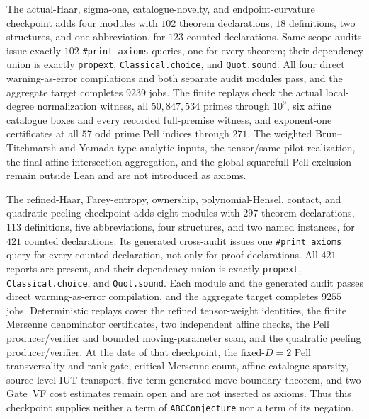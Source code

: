 \documentclass[11pt]{amsart}
\theoremstyle{definition}
\theoremstyle{remark}
\begin{document}
The actual-Haar, sigma-one, catalogue-novelty, and endpoint-curvature
checkpoint adds four modules with $102$ theorem declarations, $18$
definitions, two structures, and one abbreviation, for $123$ counted
declarations.  Same-scope audits issue exactly $102$
\texttt{\#print axioms} queries, one for every theorem; their dependency
union is exactly \texttt{propext}, \texttt{Classical.choice}, and
\texttt{Quot.sound}.  All four direct warning-as-error compilations and both
separate audit modules pass, and the aggregate target completes $9239$ jobs.
The finite replays check the actual local-degree normalization witness, all
$50{,}847{,}534$ primes through $10^9$, six affine catalogue boxes and every
recorded full-premise witness, and exponent-one certificates at all $57$ odd
prime Pell indices through $271$.  The weighted Brun--Titchmarsh and
Yamada-type analytic inputs, the tensor/same-pilot realization, the final
affine intersection aggregation, and the global squarefull Pell exclusion
remain outside Lean and are not introduced as axioms.

\begin{sloppypar}
The refined-Haar, Farey-entropy, ownership, polynomial-Hensel, contact, and
quadratic-peeling checkpoint adds eight modules with $297$ theorem
declarations, $113$ definitions, five abbreviations, four structures, and two
named instances, for $421$ counted declarations.  Its generated cross-audit
issues one \texttt{\#print axioms} query for every counted declaration, not
only for proof declarations.  All $421$ reports are present, and their
dependency union is exactly \texttt{propext}, \texttt{Classical.choice}, and
\texttt{Quot.sound}.  Each module and the generated audit passes direct
warning-as-error compilation, and the aggregate target completes $9255$
jobs.  Deterministic replays cover the refined tensor-weight identities, the
finite Mersenne denominator certificates, two independent affine checks, the
Pell producer/verifier and bounded moving-parameter scan, and the quadratic
peeling producer/verifier.  At the date of that checkpoint, the fixed-$D=2$
Pell transversality and rank gate,
critical Mersenne count, affine catalogue sparsity, source-level IUT transport,
five-term generated-move boundary theorem, and two Gate~VF cost estimates
remain open and are not inserted as axioms.  Thus this checkpoint supplies
neither a term of \texttt{ABCConjecture} nor a term of its negation.
\end{sloppypar}
\end{document}
